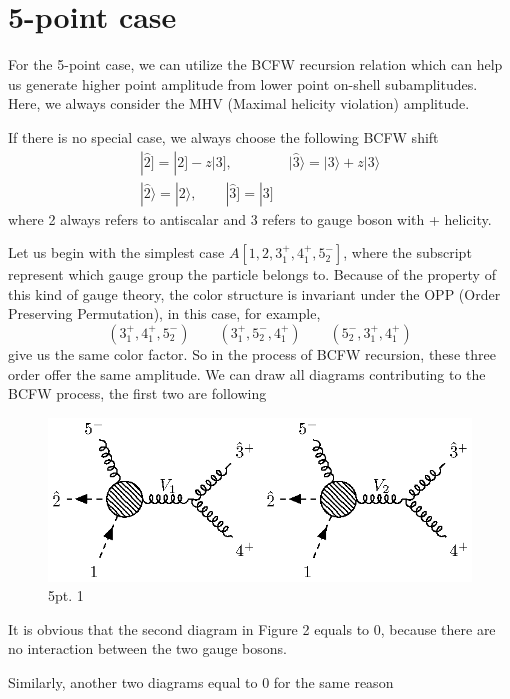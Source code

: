\documentclass[12pt]{article}
\newcommand{\aket}[1]{|#1\rangle}
\newcommand{\sket}[1]{|#1]}
\begin{document}
\section{5-point case}
For the 5-point case, we can utilize the BCFW recursion relation which can help us generate higher point amplitude from lower point on-shell subamplitudes. Here, 
we always consider the MHV (Maximal helicity violation) amplitude. 
\par
If there is no special case, we always choose the following BCFW shift
\begin{gather*}
    \sket{\hat{2}}=\sket{2}-z\sket{3},\qquad \qquad \aket{\hat{3}}=\aket{3}+z\aket{3}\\
    \aket{\hat{2}}=\aket{2}, \qquad \sket{\hat{3}}=\sket{3}
\end{gather*}
where 2 always refers to antiscalar and 3 refers to gauge boson with + helicity.
\par
Let us begin with the simplest case $A[1,2,3_1^+,4_1^+,5_2^-]$, where the subscript represent which gauge group the particle belongs to. Because of the property 
of this kind of gauge theory, the color structure is invariant under the OPP (Order Preserving Permutation), in this case, for example,
\begin{equation*}
    (3_1^+,4_1^+,5_2^-)\qquad (3_1^+,5_2^-,4_1^+)\qquad(5_2^-,3_1^+,4_1^+)
\end{equation*}
give us the same color factor. So in the process of BCFW recursion, these three order offer the same amplitude. We can draw all diagrams contributing to the BCFW process, the first two are following
\par
\begin{figure}[H]
    \centering
    \includegraphics{5pt1.eps}
    \caption{5pt. 1}
    \label{2}
\end{figure}
It is obvious that the second diagram in Figure 2 equals to 0, because there are no interaction between the two gauge bosons.
\par
Similarly, another two diagrams equal to 0 for the same reason
\end{document}
